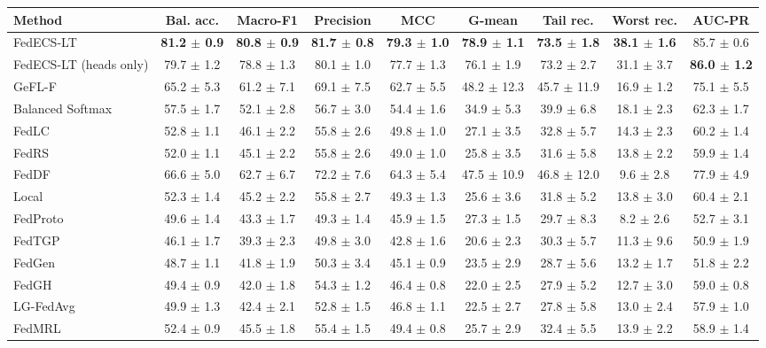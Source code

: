 \begin{tabular}{lcccccccc}
\toprule
Method & Bal. acc. & Macro-F1 & Precision & MCC & G-mean & Tail rec. & Worst rec. & AUC-PR\\
\midrule
FedECS-LT & \textbf{81.2 $\pm$ 0.9} & \textbf{80.8 $\pm$ 0.9} & \textbf{81.7 $\pm$ 0.8} & \textbf{79.3 $\pm$ 1.0} & \textbf{78.9 $\pm$ 1.1} & \textbf{73.5 $\pm$ 1.8} & \textbf{38.1 $\pm$ 1.6} & 85.7 $\pm$ 0.6\\
FedECS-LT (heads only) & 79.7 $\pm$ 1.2 & 78.8 $\pm$ 1.3 & 80.1 $\pm$ 1.0 & 77.7 $\pm$ 1.3 & 76.1 $\pm$ 1.9 & 73.2 $\pm$ 2.7 & 31.1 $\pm$ 3.7 & \textbf{86.0 $\pm$ 1.2}\\
GeFL-F & 65.2 $\pm$ 5.3 & 61.2 $\pm$ 7.1 & 69.1 $\pm$ 7.5 & 62.7 $\pm$ 5.5 & 48.2 $\pm$ 12.3 & 45.7 $\pm$ 11.9 & 16.9 $\pm$ 1.2 & 75.1 $\pm$ 5.5\\
Balanced Softmax & 57.5 $\pm$ 1.7 & 52.1 $\pm$ 2.8 & 56.7 $\pm$ 3.0 & 54.4 $\pm$ 1.6 & 34.9 $\pm$ 5.3 & 39.9 $\pm$ 6.8 & 18.1 $\pm$ 2.3 & 62.3 $\pm$ 1.7\\
FedLC & 52.8 $\pm$ 1.1 & 46.1 $\pm$ 2.2 & 55.8 $\pm$ 2.6 & 49.8 $\pm$ 1.0 & 27.1 $\pm$ 3.5 & 32.8 $\pm$ 5.7 & 14.3 $\pm$ 2.3 & 60.2 $\pm$ 1.4\\
FedRS & 52.0 $\pm$ 1.1 & 45.1 $\pm$ 2.2 & 55.8 $\pm$ 2.6 & 49.0 $\pm$ 1.0 & 25.8 $\pm$ 3.5 & 31.6 $\pm$ 5.8 & 13.8 $\pm$ 2.2 & 59.9 $\pm$ 1.4\\
FedDF & 66.6 $\pm$ 5.0 & 62.7 $\pm$ 6.7 & 72.2 $\pm$ 7.6 & 64.3 $\pm$ 5.4 & 47.5 $\pm$ 10.9 & 46.8 $\pm$ 12.0 & 9.6 $\pm$ 2.8 & 77.9 $\pm$ 4.9\\
Local & 52.3 $\pm$ 1.4 & 45.2 $\pm$ 2.2 & 55.8 $\pm$ 2.7 & 49.3 $\pm$ 1.3 & 25.6 $\pm$ 3.6 & 31.8 $\pm$ 5.2 & 13.8 $\pm$ 3.0 & 60.4 $\pm$ 2.1\\
FedProto & 49.6 $\pm$ 1.4 & 43.3 $\pm$ 1.7 & 49.3 $\pm$ 1.4 & 45.9 $\pm$ 1.5 & 27.3 $\pm$ 1.5 & 29.7 $\pm$ 8.3 & 8.2 $\pm$ 2.6 & 52.7 $\pm$ 3.1\\
FedTGP & 46.1 $\pm$ 1.7 & 39.3 $\pm$ 2.3 & 49.8 $\pm$ 3.0 & 42.8 $\pm$ 1.6 & 20.6 $\pm$ 2.3 & 30.3 $\pm$ 5.7 & 11.3 $\pm$ 9.6 & 50.9 $\pm$ 1.9\\
FedGen & 48.7 $\pm$ 1.1 & 41.8 $\pm$ 1.9 & 50.3 $\pm$ 3.4 & 45.1 $\pm$ 0.9 & 23.5 $\pm$ 2.9 & 28.7 $\pm$ 5.6 & 13.2 $\pm$ 1.7 & 51.8 $\pm$ 2.2\\
FedGH & 49.4 $\pm$ 0.9 & 42.0 $\pm$ 1.8 & 54.3 $\pm$ 1.2 & 46.4 $\pm$ 0.8 & 22.0 $\pm$ 2.5 & 27.9 $\pm$ 5.2 & 12.7 $\pm$ 3.0 & 59.0 $\pm$ 0.8\\
LG-FedAvg & 49.9 $\pm$ 1.3 & 42.4 $\pm$ 2.1 & 52.8 $\pm$ 1.5 & 46.8 $\pm$ 1.1 & 22.5 $\pm$ 2.7 & 27.8 $\pm$ 5.8 & 13.0 $\pm$ 2.4 & 57.9 $\pm$ 1.0\\
FedMRL & 52.4 $\pm$ 0.9 & 45.5 $\pm$ 1.8 & 55.4 $\pm$ 1.5 & 49.4 $\pm$ 0.8 & 25.7 $\pm$ 2.9 & 32.4 $\pm$ 5.5 & 13.9 $\pm$ 2.2 & 58.9 $\pm$ 1.4\\
\bottomrule
\end{tabular}
